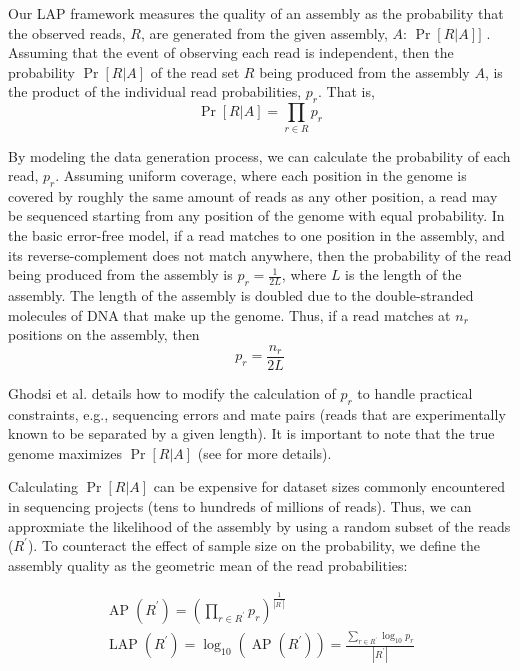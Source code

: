 \documentclass[conference]{IEEEtran}
\begin{document}
Our LAP framework measures the quality of an assembly as the probability that the observed reads, $R$, are generated from the given assembly, $A$: $\Pr[R|A]]$ \cite{LAP}.
Assuming that the event of observing each read is independent, then the probability $\Pr[R|A]$ of the read set $R$ being produced from the assembly $A$, is the product of the individual read probabilities, $p_r$.  That is,
\begin{equation}
  \label{probability_reads_given_assembly}
  \Pr[R \vert A]=\prod_{r \in R} p_r
\end{equation}

By modeling the data generation process, we can calculate the probability of each read, $p_r$.
Assuming uniform coverage, where each position in the genome is covered by roughly the same amount of reads as any other position, a read may be sequenced starting from any position of the genome with equal probability.
In the basic error-free model, if a read matches to one position in the assembly, and its reverse-complement does not match anywhere, then the probability of the read being produced from the assembly is $p_r=\frac{1}{2L}$, where $L$ is the length of the assembly.
The length of the assembly is doubled due to the double-stranded molecules of DNA that make up the genome.
Thus, if a read 
matches at $n_r$ positions on the assembly, then
\begin{equation}
  \label{error_free_probability}
  p_r = \frac{n_r}{2L}
\end{equation}

Ghodsi et al. details how to modify the calculation of $p_r$ to handle practical constraints, e.g., sequencing errors and mate pairs (reads that are experimentally known to be separated by a given length).
It is important to note that the true genome maximizes $\Pr[R|A]$ (see \cite{LAP} for more details).

Calculating $\Pr[R|A]$ can be expensive for dataset sizes commonly encountered in sequencing projects (tens to hundreds of millions of reads).
Thus, we can approxmiate the likelihood of the assembly by using a random subset of the reads ($R^\prime$).
To counteract the effect of sample size on the probability, we define the assembly quality as the geometric mean of the read probabilities:

\begin{align}
\label{average_log_probability}
  \operatorname{AP}(R^\prime) = 
  \left(\prod_{r \in R^\prime} p_r\right)^{\frac{1}{\left|R^\prime\right|}} \nonumber  \\
  \operatorname{LAP}(R^\prime) = \log_{10} \left( \operatorname{AP}(R^\prime) \right) = \frac{\sum_{r \in R^\prime} \log_{10} p_r}{\left|R^\prime\right|}
\end{align}
\end{document}
